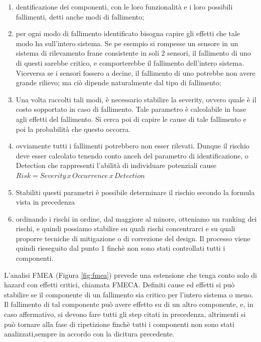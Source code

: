 \documentclass{article}
\begin{document}
\begin{enumerate}
  \item dentificazione dei componenti, con le loro funzionalità e i loro possibili
    fallimenti, detti anche modi di fallimento;
  \item per ogni modo di fallimento identificato bisogna capire gli effetti che tale
    modo ha sull’intero sistema. Se pe esempio si rompesse un sensore in un
    sistema di rilevamento frane consistente in soli 2 sensori, il fallimento di
    uno di questi sarebbe critico, e comporterebbe il fallimento dell’intero
    sistema. Viceversa se i sensori fossero a decine, il fallimento di uno
    potrebbe non avere grande rilievo; ma ciò dipende naturalmente dal
    tipo di fallimento; 
  \item Una volta raccolti tali modi, è necessario stabilire la severity, ovvero
    quale è il costo sopportato in caso di fallimento. Tale parametro è
    calcolabile in base agli effetti del fallimento. Si cerca poi di capire le
    cause di tale fallimento e poi la probabilità che questo occorra. 
  \item ovviamente tutti i fallimenti potrebbero non esser rilevati. Dunque
    il rischio deve esser calcolato tenendo conto anceh del parametro di
    identificazione, o Detection che rappresenti l’abilità di individuare
    potenziali cause $Risk = Severity\, x\, Occurrence\, x\, Detection$ 
  \item Stabiliti questi parametri è possibile determinare il rischio secondo la
    formula vista in precedenza
  \item ordinando i rischi in ordine, dal maggiore al minore, otteniamo un ranking dei rischi,
    e quindi possiamo stabilire su quali rischi concentrarci
    e su quali proporre tecniche di mitigazione o di correzione del design. Il processo viene
    quindi rieseguito dal punto 1 finchè non sono stati controllati tutti i componenti.
\end{enumerate}

L’analisi FMEA (Figura \ref{fig:fmea}) prevede una estensione che tenga conto solo di hazard
con effetti critici, chiamata FMECA. Definiti cause ed effetti si può stabilire se il
componente di un fallimento sia critico per l’intero sistema o meno. Il fallimento di tal
componente può avere effetto su di un altro componente, e, in caso affermativo, si devono
fare tutti gli step citati in precedenza, altrimenti si può tornare alla fase di 
ripetizione finchè tutti i componenti non sono stati analizzati,sempre in accordo con la
dicitura precedente.
\end{document}
